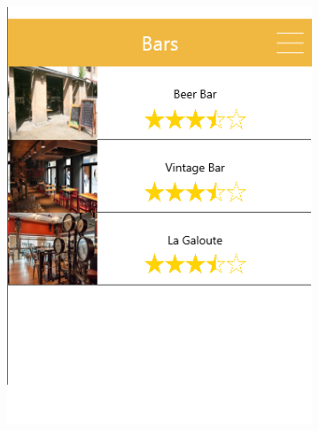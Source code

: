 \documentclass{eplmastersthesis}
\begin{document}
\begin{figure}[H]
    \begin{subfigure}[b]{0.3\textwidth}
        \includegraphics[width=\textwidth]{Images/InVision/liste-bars.png}
    \end{subfigure}
    ~ %
    \begin{subfigure}[b]{0.3\textwidth}

\end{subfigure}
\end{figure}
\end{document}

